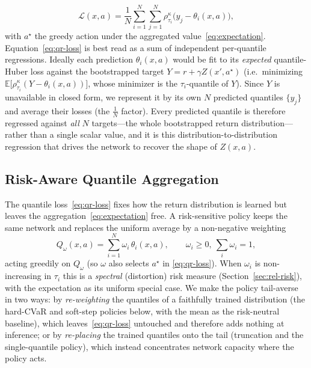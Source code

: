\documentclass[conference]{IEEEtran}
\begin{document}
\begin{equation}
\mathcal{L}(x,a) = \frac{1}{N}\sum_{i=1}^{N}\sum_{j=1}^{N}
   \rho^{\kappa}_{\tau_i}\!\big(y_j - \theta_i(x,a)\big),
\label{eq:qr-loss}
\end{equation}
with $a^\star$ the greedy action under the aggregated value~\eqref{eq:expectation}.
Equation~\eqref{eq:qr-loss} is best read as a sum of independent per-quantile
regressions. Ideally each prediction $\theta_i(x,a)$ would be fit to its
\emph{expected} quantile-Huber loss against the bootstrapped target
$Y = r + \gamma Z(x',a^\star)$ (i.e.\ minimizing
$\mathbb{E}\!\big[\rho^\kappa_{\tau_i}(Y-\theta_i(x,a))\big]$, whose minimizer is
the $\tau_i$-quantile of $Y$). Since $Y$ is unavailable in closed form, we
represent it by its own $N$ predicted quantiles $\{y_j\}$ and average their losses
(the $\tfrac1N$ factor). Every predicted quantile is therefore regressed
against \emph{all} $N$ targets---the whole bootstrapped return distribution---rather
than a single scalar value, and it is this distribution-to-distribution regression
that drives the network to recover the shape of $Z(x,a)$.

\subsection{Risk-Aware Quantile Aggregation}
\label{sec:method-risk}
The quantile loss~\eqref{eq:qr-loss} fixes how the return distribution is
learned but leaves the aggregation~\eqref{eq:expectation} free. A risk-sensitive
policy keeps the same network and replaces the uniform average by a non-negative
weighting
\begin{equation}
Q_\omega(x,a) = \sum_{i=1}^{N}\omega_i\,\theta_i(x,a),
\qquad \omega_i\ge 0,\ \textstyle\sum_i\omega_i = 1,
\label{eq:risk-agg}
\end{equation}
acting greedily on $Q_\omega$ (so $\omega$ also selects $a^\star$ in
\eqref{eq:qr-loss}). When $\omega_i$ is non-increasing in $\tau_i$ this is a
\emph{spectral} (distortion) risk measure (Section~\ref{sec:rel-risk}), with the
expectation as its uniform special case. We make the policy tail-averse in two
ways: by \emph{re-weighting} the quantiles of a faithfully trained distribution
(the hard-CVaR and soft-step policies below, with the mean as the risk-neutral
baseline), which leaves~\eqref{eq:qr-loss} untouched and therefore adds nothing at
inference; or by \emph{re-placing} the trained quantiles onto the tail (truncation
and the single-quantile policy), which instead concentrates network capacity where
the policy acts.
\end{document}
